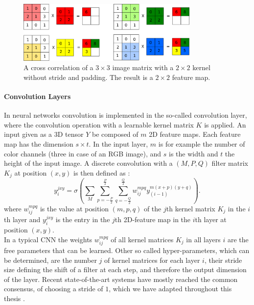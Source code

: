 \begin{figure}
	\centering
    	\includegraphics[width=0.8\textwidth]{imgs/convolution.png} 
    \caption[A cross correlation of a $3\times3$ image matrix with a $2\times2$ kernel.]{A cross correlation of a $3\times3$ image matrix with a $2\times2$ kernel without stride and padding. The result is a $2\times2$ feature map.}
	\label{fig:conv}
\end{figure}

\paragraph{Convolution Layers} \label{c:convlayers}

In neural networks convolution is implemented in the so-called convolution layer, where the convolution operation with a learnable kernel matrix $K$ is applied. 
An input given as a 3D tensor $Y$ be composed of $m$ 2D feature maps. Each feature map has the dimension $s \times t$. 
In the input layer, $m$ is for example the number of color channels (three in case of an RGB image), and $s$ is the width and $t$ the height of the input image. 
A discrete convolution with a $(M , P , Q)$ filter matrix $K_j$ at position $(x,y)$ is then defined as : 
\[
y_{i}^{jxy} = \sigma(\sum_M \sum_{p=-\frac{P}{2}}^{\frac{P}{2}} \sum_{q=-\frac{Q}{2}}^{\frac{Q}{2}} w_{ij}^{mpq} y_{(i-1)}^{m(x+p)(y+q)}) .
\]
where $w_{ij}^{mpq}$ is the value at position $(m,p,q)$ of the $j$th kernel matrix $K_j$ in the $i$th layer and $y_{i}^{jxy}$ is the entry in the $j$th 2D-feature map in the $i$th layer at position $(x, y)$.\\
In a typical CNN the weights $w_{ij}^{mpq}$ of all kernel matrices $K_j$ in all layers $i$ are the free parameters that can be learned. 
Other so called hyper-parameters, which can be determined, are the number $j$ of kernel matrices for each layer $i$, their stride size defining the shift of a filter at each step, and therefore the output dimension of the layer.
Recent state-of-the-art systems have mostly reached the common consensus, of choosing a stride of $1$, which we have adapted throughout this thesis \cite{simonyan2014very}.


